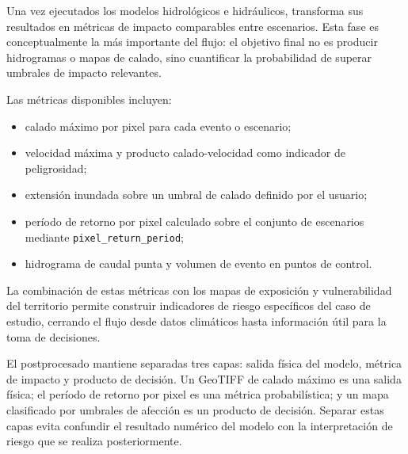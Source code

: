 Una vez ejecutados los modelos hidrológicos e hidráulicos, \hydra transforma sus resultados en métricas de impacto comparables entre escenarios. Esta fase es conceptualmente la más importante del flujo: el objetivo final no es producir hidrogramas o mapas de calado, sino cuantificar la probabilidad de superar umbrales de impacto relevantes.

Las métricas disponibles incluyen:
\begin{itemize}
  \item calado máximo por pixel para cada evento o escenario;
  \item velocidad máxima y producto calado-velocidad como indicador de peligrosidad;
  \item extensión inundada sobre un umbral de calado definido por el usuario;
  \item período de retorno por pixel calculado sobre el conjunto de escenarios mediante \texttt{pixel\_return\_period};
  \item hidrograma de caudal punta y volumen de evento en puntos de control.
\end{itemize}

La combinación de estas métricas con los mapas de exposición y vulnerabilidad del territorio permite construir indicadores de riesgo específicos del caso de estudio, cerrando el flujo desde datos climáticos hasta información útil para la toma de decisiones.

El postprocesado mantiene separadas tres capas: salida física del modelo, métrica de impacto y producto de decisión. Un GeoTIFF de calado máximo es una salida física; el período de retorno por pixel es una métrica probabilística; y un mapa clasificado por umbrales de afección es un producto de decisión. Separar estas capas evita confundir el resultado numérico del modelo con la interpretación de riesgo que se realiza posteriormente.

